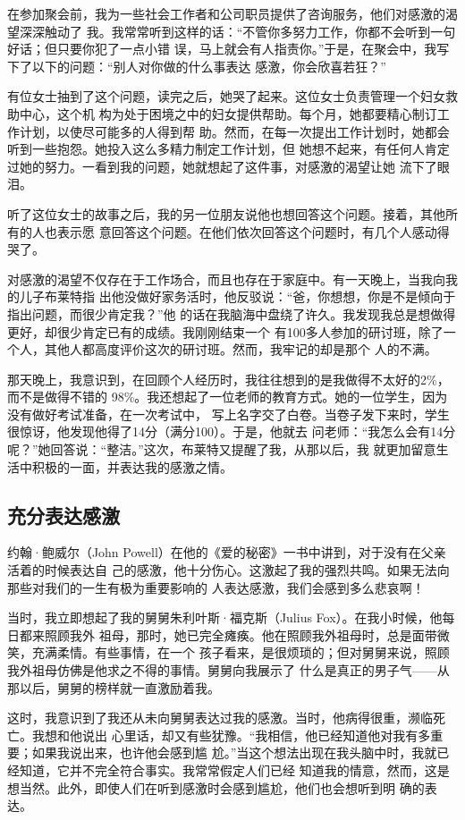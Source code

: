 \documentclass{ctexart}
\begin{document}
在参加聚会前，我为一些社会工作者和公司职员提供了咨询服务，他们对感激的渴望深深触动了
我。我常常听到这样的话：``不管你多努力工作，你都不会听到一句好话；但只要你犯了一点小错
误，马上就会有人指责你。''于是，在聚会中，我写下了以下的问题：``别人对你做的什么事表达
感激，你会欣喜若狂？''

有位女士抽到了这个问题，读完之后，她哭了起来。这位女士负责管理一个妇女救助中心，这个机
构为处于困境之中的妇女提供帮助。每个月，她都要精心制订工作计划，以使尽可能多的人得到帮
助。然而，在每一次提出工作计划时，她都会听到一些抱怨。她投入这么多精力制定工作计划，但
她想不起来，有任何人肯定过她的努力。一看到我的问题，她就想起了这件事，对感激的渴望让她
流下了眼泪。

听了这位女士的故事之后，我的另一位朋友说他也想回答这个问题。接着，其他所有的人也表示愿
意回答这个问题。在他们依次回答这个问题时，有几个人感动得哭了。

对感激的渴望不仅存在于工作场合，而且也存在于家庭中。有一天晚上，当我向我的儿子布莱特指
出他没做好家务活时，他反驳说：``爸，你想想，你是不是倾向于指出问题，而很少肯定我？''他
的话在我脑海中盘绕了许久。我发现我总是想做得更好，却很少肯定已有的成绩。我刚刚结束一个
有100多人参加的研讨班，除了一个人，其他人都高度评价这次的研讨班。然而，我牢记的却是那个
人的不满。

那天晚上，我意识到，在回顾个人经历时，我往往想到的是我做得不太好的2\%，而不是做得不错的
98\%。我还想起了一位老师的教育方式。她的一位学生，因为没有做好考试准备，在一次考试中，
写上名字交了白卷。当卷子发下来时，学生很惊讶，他发现他得了14分（满分100）。于是，他就去
问老师：``我怎么会有14分呢？''她回答说：``整洁。''这次，布莱特又提醒了我，从那以后，我
就更加留意生活中积极的一面，并表达我的感激之情。


\subsection{充分表达感激}

约翰·鲍威尔（John Powell）在他的《爱的秘密》一书中讲到，对于没有在父亲活着的时候表达自
己的感激，他十分伤心。这激起了我的强烈共鸣。如果无法向那些对我们的一生有极为重要影响的
人表达感激，我们会感到多么悲哀啊！

当时，我立即想起了我的舅舅朱利叶斯·福克斯（Julius Fox）。在我小时候，他每日都来照顾我外
祖母，那时，她已完全瘫痪。他在照顾我外祖母时，总是面带微笑，充满柔情。有些事情，在一个
孩子看来，是很烦琐的；但对舅舅来说，照顾我外祖母仿佛是他求之不得的事情。舅舅向我展示了
什么是真正的男子气------从那以后，舅舅的榜样就一直激励着我。

这时，我意识到了我还从未向舅舅表达过我的感激。当时，他病得很重，濒临死亡。我想和他说出
心里话，却又有些犹豫。``我相信，他已经知道他对我有多重要；如果我说出来，也许他会感到尴
尬。''当这个想法出现在我头脑中时，我就已经知道，它并不完全符合事实。我常常假定人们已经
知道我的情意，然而，这是想当然。此外，即使人们在听到感激时会感到尴尬，他们也会想听到明
确的表达。
\end{document}
